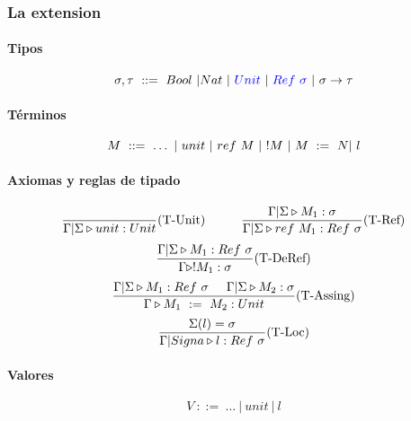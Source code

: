 \subsubsection{La extension}

\paragraph{Tipos}
$$\sigma, \tau ~::=~ Bool~|Nat~|~\color{blue}Unit\color{black}~|~\color{blue}Ref~\sigma\color{black}~|~\sigma\to\tau$$

\paragraph{Términos}

$$ M~::=~ \dots~|~unit~|~ref~M~|~!M~|~M~:=~N |~    l$$

\paragraph{Axiomas y reglas de tipado}
\begin{equation*}
\frac{}{\Gamma|\Sigma\triangleright unit : Unit}(\text{T-Unit})\hspace*{1cm}\frac{\Gamma|\Sigma\triangleright M_1 : \sigma}{\Gamma|\Sigma\triangleright ref~M_1 : Ref~\sigma}(\text{T-Ref})
\end{equation*}
\vspace*{5mm}
\begin{equation*}
\frac{\Gamma|\Sigma\triangleright M_1 : Ref~\sigma}{\Gamma\triangleright !M_1 : \sigma}(\text{T-DeRef})
\end{equation*}
\vspace*{5mm}
\begin{equation*}
\frac{\Gamma|\Sigma\triangleright M_1 : Ref~\sigma\hspace*{5mm}\Gamma|\Sigma\triangleright M_2 : \sigma}{\Gamma\triangleright M_1~:=~M_2 : Unit}(\text{T-Assing})
\end{equation*}
\vspace*{5mm}
\begin{equation*}
\frac{\Sigma(l) = \sigma}{\Gamma|Signa\triangleright l : Ref~\sigma}(\text{T-Loc})
\end{equation*}

\paragraph{Valores}
$$V~::=~\dots~|~unit~|~l$$

